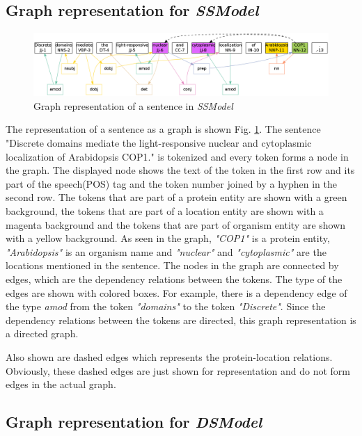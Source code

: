 \subsection{Graph representation for \textit{SSModel}}\label{sec:graphSSModel}

\begin{figure}
\centering
\includegraphics[scale=0.3]{figures/SameSentenceGraph.png}
\caption{Graph representation of a sentence in \textit{SSModel}}\label{fig:SSGraph}
\end{figure}

The representation of a sentence as a graph is shown Fig. \ref{fig:SSGraph}. The sentence "Discrete domains mediate the light-responsive nuclear and cytoplasmic localization of Arabidopsis COP1." is tokenized and every token forms a node in the graph. The displayed node shows the text of the token in the first row and its part of the speech(POS) tag and the token number joined by a hyphen in the second row. The tokens that are part of a protein entity are shown with a green background, the tokens that are part of a location entity are shown with a magenta background and the tokens that are part of organism entity are shown with a yellow  background. As seen in the graph, \textit{"COP1"} is a protein entity, \textit{"Arabidopsis"} is an organism name and \textit{"nuclear"} and \textit{"cytoplasmic"} are the locations mentioned in the sentence. The nodes in the graph are connected by edges, which are the dependency
 relations between the tokens. The type of the edges are shown with colored boxes. For example, there is a dependency edge of the type \textit{amod} from the token \textit{"domains"}  to  the token \textit{"Discrete"}. Since the dependency relations between the tokens are directed, this graph representation is a directed graph. 

Also shown are dashed edges which represents the protein-location relations. Obviously, these dashed edges are just shown for representation and do not form edges in the actual graph.

\subsection{Graph representation for \textit{DSModel}}\label{sec:graphDSModel}

